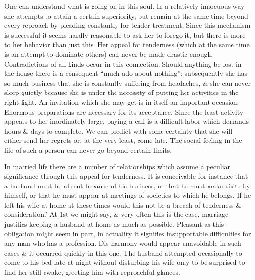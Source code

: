 \documentclass{article}
\begin{document}
One can understand what is going on in this soul. In a relatively innocuous way she attempts to attain a certain superiority, but remain at the same time beyond every reproach by pleading constantly for tender treatment. Since this mechanism is successful it seems hardly reasonable to ask her to forego it, but there is more to her behavior than just this. Her appeal for tenderness (which at the same time is an attempt to dominate others) can never be made drastic enough. Contradictions of all kinds occur in this connection. Should anything be lost in the house there is a consequent ``much ado about nothing''; subsequently she has so much business that she is constantly suffering from headaches, \& she can never sleep quietly because she is under the necessity of putting her activities in the right light. An invitation which she may get is in itself an important occasion. Enormous preparations are necessary for its acceptance. Since the least activity appears to her inordinately large, paying a call is a difficult labor which demands hours \& days to complete. We can predict with some certainty that she will either send her regrets or, at the very least, come late. The social feeling in the life of such a person can never go beyond certain limits.

In married life there are a number of relationships which assume a peculiar significance through this appeal for tenderness. It is conceivable for instance that a husband must be absent because of his business, or that he must make visits by himself, or that he must appear at meetings of societies to which he belongs. If he left his wife at home at these times would this not be a breach of tenderness \& consideration? At 1st we might say, \& very often this is the case, marriage justifies keeping a husband at home as much as possible. Pleasant as this obligation might seem in part, in actuality it signifies insupportable difficulties for any man who has a profession. Dis-harmony would appear unavoidable in such cases \& it occurred quickly in this one. The husband attempted occasionally to come to his bed late at night without disturbing his wife only to be surprised to find her still awake, greeting him with reproachful glances.
\end{document}
